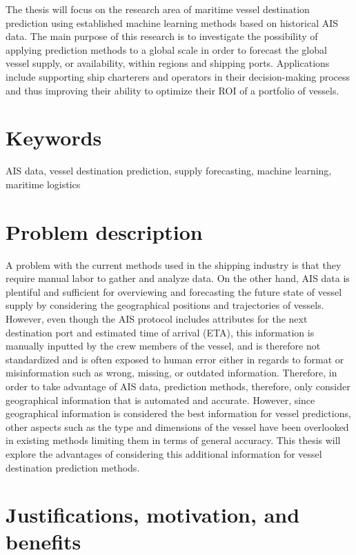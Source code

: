 The thesis will focus on the research area of maritime vessel destination prediction using established machine learning methods based on historical AIS data. The main purpose of this research is to investigate the possibility of applying prediction methods to a global scale in order to forecast the global vessel supply, or availability, within regions and shipping ports. Applications include supporting ship charterers and operators in their decision-making process and thus improving their ability to optimize their ROI of a portfolio of vessels.

\section{Keywords}

AIS data, vessel destination prediction, supply forecasting, machine learning, maritime logistics

\section{Problem description}
\label{sec:problem_desc}

A problem with the current methods used in the shipping industry is that they require manual labor to gather and analyze data. On the other hand, AIS data is plentiful and sufficient for overviewing and forecasting the future state of vessel supply by considering the geographical positions and trajectories of vessels. However, even though the AIS protocol includes attributes for the next destination port and estimated time of arrival (ETA), this information is manually inputted by the crew members of the vessel, and is therefore not standardized and is often exposed to human error either in regards to format or misinformation such as wrong, missing, or outdated information. Therefore, in order to take advantage of AIS data, prediction methods, therefore, only consider geographical information that is automated and accurate. However, since geographical information is considered the best information for vessel predictions, other aspects such as the type and dimensions of the vessel have been overlooked in existing methods limiting them in terms of general accuracy. This thesis will explore the advantages of considering this additional information for vessel destination prediction methods.

\section{Justifications, motivation, and benefits}
\label{section:justifications_motivations_benefits}

